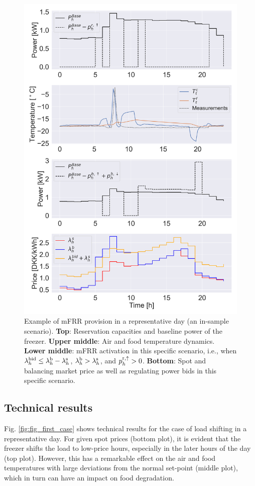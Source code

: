 \documentclass[11pt,a4paper]{article}
\begin{document}
\begin{figure}[t]
    \centering
    \includegraphics[width=\columnwidth]{figures/mFRR_single_case.png}
    \caption{Example of mFRR  provision  in a representative day (an in-sample scenario). \textbf{Top}: Reservation capacities and baseline power of the freezer. \textbf{Upper middle}: Air and food temperature dynamics. \textbf{Lower middle}: mFRR activation in this specific scenario, i.e., when $\lambda_{h}^{\rm{bid}} \leq \lambda_{h}^{\rm{b}}-\lambda_{h}^{\rm{s}}$, $\lambda_{h}^{\rm{b}} > \lambda_{h}^{\rm{s}}$, and $p^{\rm{r},\uparrow}_{h} > 0$. \textbf{Bottom}: Spot and balancing market price as well as regulating power bids in this specific scenario.}
    \label{fig:fig_second_case}
\end{figure}


\subsection{Technical results}
Fig. \ref{fig:fig_first_case} shows technical results for the case of load shifting in a representative day. For given spot prices (bottom plot), it is evident that the freezer shifts the load to low-price hours, especially in the later hours of the day (top plot). However, this has a remarkable effect on the air and food temperatures with large deviations from the normal set-point (middle plot), which in turn can have an impact on food degradation.
\end{document}
